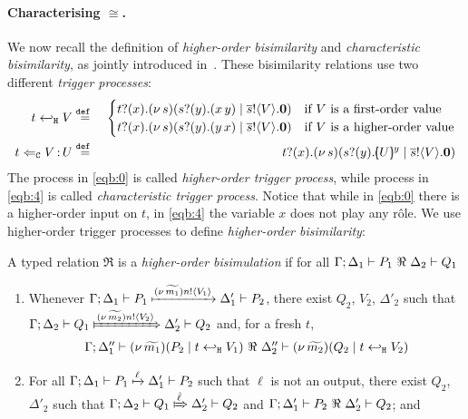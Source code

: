 \documentclass[runningheads]{llncs}
\begin{document}
{{\paragraph{Characterising $\cong$.}
We now recall the definition of \emph{higher-order bisimilarity} and 
\emph{characteristic bisimilarity}, as jointly introduced in~\cite{KouzapasPY17}.
These bisimilarity relations
use two different \emph{trigger processes}:
%
\begin{eqnarray}
	t \hookleftarrow_{\mathtt{H}} V	& \stackrel{\mathtt{def}\ }{=} &
	\begin{cases}
		t ? (x) . (\nu\, s)(s ? (y) . (x\, {y}) \;|\; \overline{s} ! \langle V \rangle . \mathbf{0}) & {\text{if $V$ is a first-order value}}\\
		t ? (x) . (\nu\, s)(s ? (y) . (y\, {x}) \;|\; \overline{s} ! \langle V \rangle . \mathbf{0}) & \text{if $V$ is a higher-order value}
		\end{cases}
	\label{eqb:0} \\
	t \Leftarrow_{\mathtt{C}} V{\,:\,}U	& \stackrel{\mathtt{def}\ }{=} &	t ? (x) . (\nu\, s)(s ? (y) . [\!\!(U)\!\!]^{y} \;|\; \overline{s} ! \langle V \rangle . \mathbf{0})	
	\label{eqb:4}
\end{eqnarray}
%
The process in \eqref{eqb:0} is called \emph{higher-order trigger process},
while process in \eqref{eqb:4} is called \emph{characteristic trigger process}.
Notice that while 
in \eqref{eqb:0} there is a higher-order input on $t$, 
in \eqref{eqb:4} the variable $x$ does not play any r\^{o}le.
We use higher-order trigger processes to define \emph{higher-order bisimilarity}:

\begin{definition}
	\label{d:hwb}
	A typed relation $\Re$ is a {\em  higher-order bisimulation} if 
	for all $\horel{\Gamma}{\Delta_1}{P_1}{\ \Re \ }{\Delta_2}{Q_1}$ 
%
	\begin{enumerate}[1)]
		\item 
				Whenever 
				$\Gamma; \Delta_1 \vdash P_1 \xmapsto{(\nu\, \widetilde{m_1}) n !\langle V_1 \rangle} \Delta_1' \vdash P_2$, there exist 
				$Q_2$, $V_2$, $\Delta'_2$ such that 
				$\horel{\Gamma}{\Delta_2}{Q_1}{\Hby{\news{\widetilde{m_2}} \bactout{n}{V_2}}}{\Delta_2'}{Q_2}$ and, for a fresh $t$, 
				\[
					\begin{array}{lrlll}
						\Gamma; \Delta''_1  \proves  {\newsp{\widetilde{m_1}}{P_2 \Par \htrigger{t}{V_1}}}
						\ \Re\ 
						\Delta''_2 \proves {\newsp{\widetilde{m_2}}{Q_2 \Par \htrigger{t}{V_2}}}
					\end{array}
				\]
		\item	
				For all $\Gamma; \Delta_1 \vdash P_1 \xmapsto{\ell} \Delta_1' \vdash P_2$ such that 
				$\ell$ is not an output, 
				there exist $Q_2$, $\Delta'_2$ such that 
				$\horel{\Gamma}{\Delta_2}{Q_1}{\Hby{\hat{\ell}}}{\Delta_2'}{Q_2}$
				and
				$\horel{\Gamma}{\Delta_1'}{P_2}{\ \Re \ }{\Delta_2'}{Q_2}$; and 


\end{enumerate}
\end{definition}}}
\end{document}
